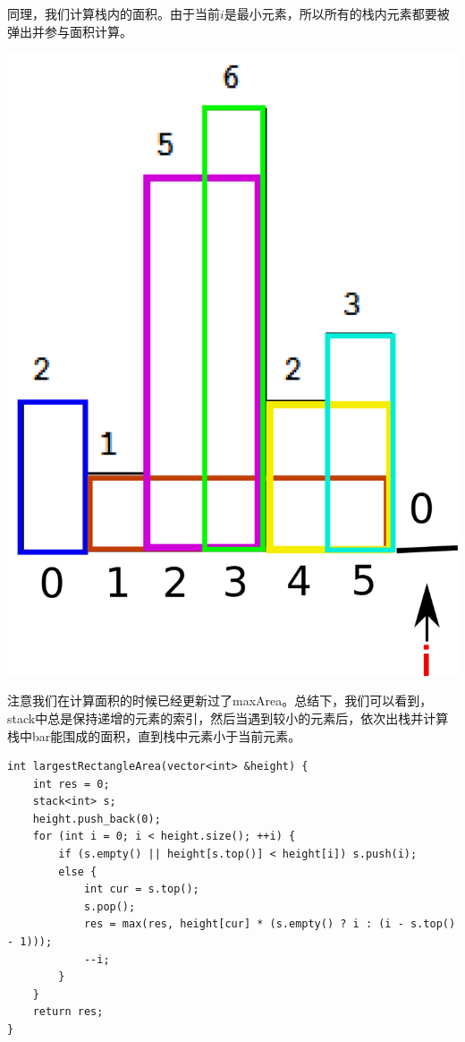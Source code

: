 \documentclass[12pt,a4paper]{article}
\begin{document}
\begin{CJK}{UTF8}{gbsn}
同理，我们计算栈内的面积。由于当前$i$是最小元素，所以所有的栈内元素都要被弹出并参与面积计算。
\end{CJK}
\begin{center}
\includegraphics[width=0.5\linewidth]{008407.png}
\end{center}
\begin{CJK}{UTF8}{gbsn}
注意我们在计算面积的时候已经更新过了maxArea。总结下，我们可以看到，stack中总是保持递增的元素的索引，然后当遇到较小的元素后，依次出栈并计算栈中bar能围成的面积，直到栈中元素小于当前元素。
\end{CJK}
\begin{lstlisting}
int largestRectangleArea(vector<int> &height) {
	int res = 0;
	stack<int> s;
	height.push_back(0);
	for (int i = 0; i < height.size(); ++i) {
		if (s.empty() || height[s.top()] < height[i]) s.push(i);
		else {
			int cur = s.top();
			s.pop();
			res = max(res, height[cur] * (s.empty() ? i : (i - s.top() - 1)));
			--i;
		}
	}
	return res;
}
\end{lstlisting}
\end{document}
